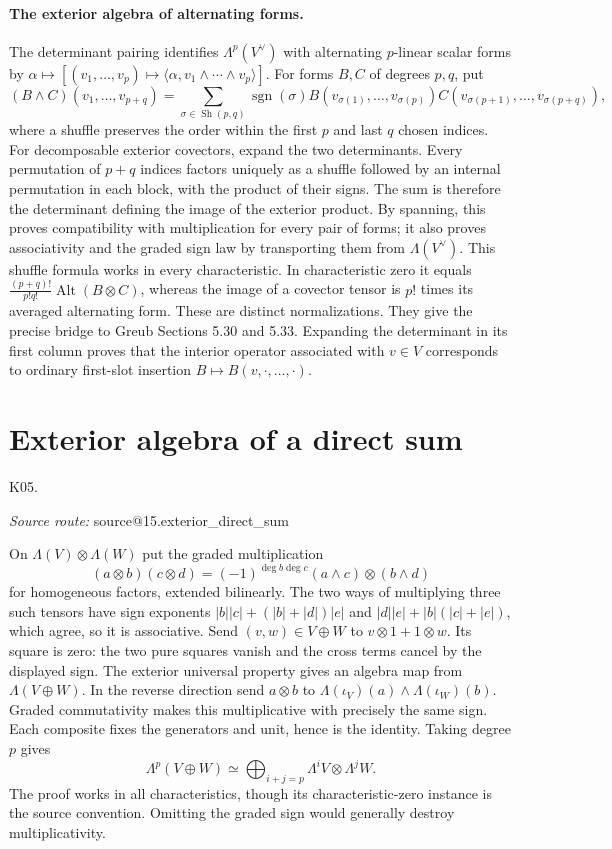 \documentclass[11pt,a4paper]{book}
\makeatletter
\theoremstyle{definition}\newtheorem{definition}[theorem]{Definition}
\theoremstyle{remark}\newtheorem{remark}[theorem]{Remark}
\newcommand{\Kentry}[2]{\section{#2}\label{k:#1}\noindent\textsf{\small K05.\detokenize{#1}}\par
  \begingroup\small\color{black!65}\textit{Source route: }\csname source@#1\endcsname\par\endgroup}
\makeatother
\begin{document}
\paragraph{The exterior algebra of alternating forms.}
The determinant pairing identifies $\Lambda^p(V^\vee)$ with alternating $p$-linear scalar forms by
$\alpha\mapsto[(v_1,\ldots,v_p)\mapsto\langle\alpha,v_1\wedge\cdots\wedge v_p\rangle]$.
For forms $B,C$ of degrees $p,q$, put
\[
 (B\wedge C)(v_1,\ldots,v_{p+q})
 =\sum_{\sigma\in\operatorname{Sh}(p,q)}\operatorname{sgn}(\sigma)
 B(v_{\sigma(1)},\ldots,v_{\sigma(p)})
 C(v_{\sigma(p+1)},\ldots,v_{\sigma(p+q)}),
\]
where a shuffle preserves the order within the first $p$ and last $q$ chosen indices. For decomposable exterior covectors, expand the two determinants. Every permutation of $p+q$ indices factors uniquely as a shuffle followed by an internal permutation in each block, with the product of their signs. The sum is therefore the determinant defining the image of the exterior product. By spanning, this proves compatibility with multiplication for every pair of forms; it also proves associativity and the graded sign law by transporting them from $\Lambda(V^\vee)$. This shuffle formula works in every characteristic. In characteristic zero it equals $\frac{(p+q)!}{p!q!}\operatorname{Alt}(B\otimes C)$, whereas the image of a covector tensor is $p!$ times its averaged alternating form. These are distinct normalizations. They give the precise bridge to Greub Sections 5.30 and 5.33. Expanding the determinant in its first column proves that the interior operator associated with $v\in V$ corresponds to ordinary first-slot insertion $B\mapsto B(v,\cdot,\ldots,\cdot)$.

\Kentry{15.exterior_direct_sum}{Exterior algebra of a direct sum}
On $\Lambda(V)\otimes\Lambda(W)$ put the graded multiplication
\[
 (a\otimes b)(c\otimes d)=(-1)^{\deg b\deg c}(a\wedge c)\otimes(b\wedge d)
\]
for homogeneous factors, extended bilinearly. The two ways of multiplying three such tensors have sign exponents $|b||c|+(|b|+|d|)|e|$ and $|d||e|+|b|(|c|+|e|)$, which agree, so it is associative. Send $(v,w)\in V\oplus W$ to $v\otimes1+1\otimes w$. Its square is zero: the two pure squares vanish and the cross terms cancel by the displayed sign. The exterior universal property gives an algebra map from $\Lambda(V\oplus W)$. In the reverse direction send $a\otimes b$ to $\Lambda(\iota_V)(a)\wedge\Lambda(\iota_W)(b)$. Graded commutativity makes this multiplicative with precisely the same sign. Each composite fixes the generators and unit, hence is the identity. Taking degree $p$ gives
\[
 \Lambda^p(V\oplus W)\simeq\bigoplus_{i+j=p}\Lambda^iV\otimes\Lambda^jW.
\]
The proof works in all characteristics, though its characteristic-zero instance is the source convention. Omitting the graded sign would generally destroy multiplicativity.
\end{document}
